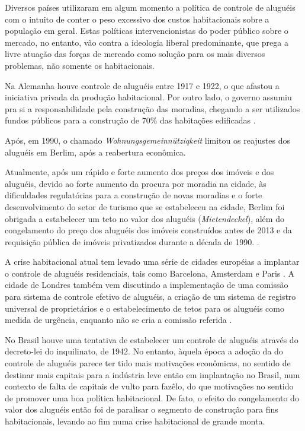 \documentclass[
	12pt,				%
	oneside,			%
	a4paper,			%
	chapter=TITLE,		%
	section=TITLE,		%
	english,			%
	brazil				%
	]{abntex2}
\begin{document}
Diversos países utilizaram em algum momento a política de controle de aluguéis
com o intuito de conter o peso excessivo dos custos habitacionais sobre a
população em geral. Estas políticas intervencionistas do poder público sobre o
mercado, no entanto, vão contra a ideologia liberal predominante, que prega a
livre atuação das forças de mercado como solução para os mais diversos problemas,
não somente os habitacionais.

Na Alemanha houve controle de aluguéis entre 1917 e 1922, o que afastou a
iniciativa privada da produção habitacional. Por outro lado, o governo assumiu
pra si a responsabilidade pela construção das moradias, chegando a ser
utilizados fundos públicos para a construção de 70\% das habitações edificadas
\autocite[89]{poleto}.

Após, em 1990, o chamado \emph{Wohnungsgemeinnütziqkeit} limitou os reajustes dos
aluguéis em Berlim, após a reabertura econômica.

Atualmente, após um rápido e forte aumento dos preços dos imóveis e dos
aluguéis, devido ao forte aumento da procura por moradia na cidade, às
dificuldades regulatórias para a construção de novas moradias e o forte
desenvolvimento do setor de turismo que se estabeleceu na cidade, Berlim foi
obrigada a estabelecer um teto no valor dos aluguéis (\emph{Mietendeckel}), além do
congelamento do preço dos aluguéis dos imóveis construídos antes de 2013 e da
requisição pública de imóveis privatizados durante a década de 1990. \autocite{berlim}.

A crise habitacional atual tem levado uma série de cidades européias a implantar
o controle de aluguéis residenciais, tais como Barcelona, Amsterdam e Paris
\autocite{economist-rent-control}. A cidade de Londres também vem discutindo a
implementação de uma comissão para sistema de controle efetivo de aluguéis, a
criação de um sistema de registro universal de proprietários e o estabelecimento
de tetos para os aluguéis como medida de urgência, enquanto não se cria a
comissão referida \autocite{guardian}.

No Brasil houve uma tentativa de estabelecer um controle de aluguéis através do
decreto-lei do inquilinato, de 1942. No entanto, àquela época a adoção da do
controle de aluguéis parece ter tido mais motivações econômicas, no sentido de
destinar mais capitais para a indústria leve então em implantação no Brasil, num
contexto de falta de capitais de vulto para fazêlo, do que motivações no sentido
de promover uma boa política habitacional. De fato, o efeito do congelamento do
valor dos aluguéis então foi de paralisar o segmento de construção para fins
habitacionais, levando ao fim numa crise habitacional de grande monta.
\autocite{bonduki_origens_1994}
\end{document}
